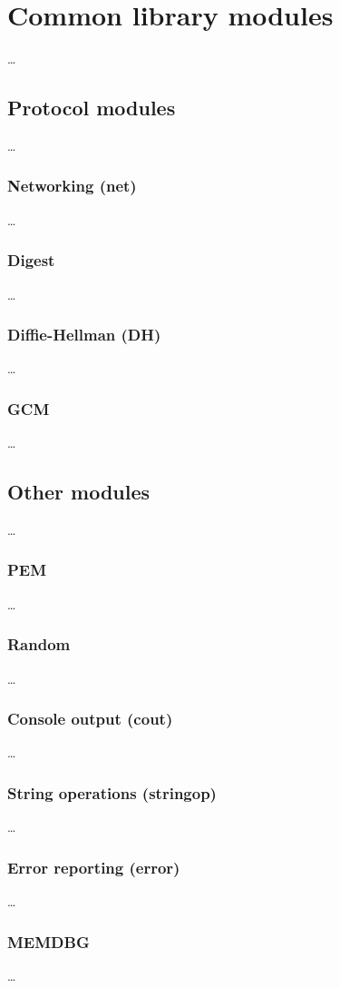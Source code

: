\section{Common library modules}\label{sec:commonmod}

\ldots

\subsection{Protocol modules}\label{subsec:protomods}

\ldots

\subsubsection{Networking (net)}

\ldots

\subsubsection{Digest}

\ldots

\subsubsection{Diffie-Hellman (DH)}

\ldots

\subsubsection{GCM}

\ldots

\subsection{Other modules}\label{subsec:othermods}

\ldots

\subsubsection{PEM}

\ldots

\subsubsection{Random}

\ldots

\subsubsection{Console output (cout)}

\ldots

\subsubsection{String operations (stringop)}

\ldots

\subsubsection{Error reporting (error)}

\ldots

\subsubsection{MEMDBG}

\ldots

